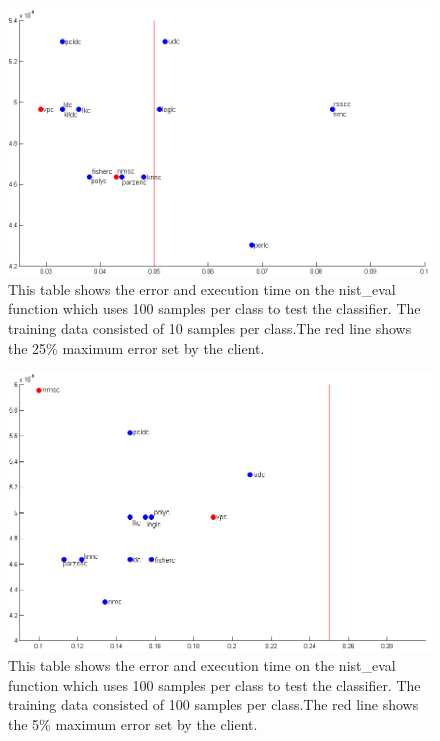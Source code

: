 \documentclass[%
        compressed,
        final,
        notitlepage,
        narroweqnarray,
        inline,
        twoside,
        ]{ieee}
\begin{document}
\begin{figure}[] 
    \includegraphics[scale=0.385]{images/large_data_set_tested.png}

    \caption{ This table shows the error and execution time on the nist\_eval
    function which uses 100 samples per class to test the classifier. The
training data consisted of 10 samples per class.The
        red line shows the 25\% maximum error set by the client. }
    \label{fig:test-large}
\end{figure}
    
\begin{figure}[]
    \includegraphics[scale=0.385]{images/small_data_set_tested.png}

    \caption{
        This table shows the error and execution time on the nist\_eval
    function which uses 100 samples per class to test the classifier. The
training data consisted of 100 samples per class.The
        red line shows the 5\% maximum error set by the client.  }
    \label{fig:test-small}
\end{figure}
\end{document}
